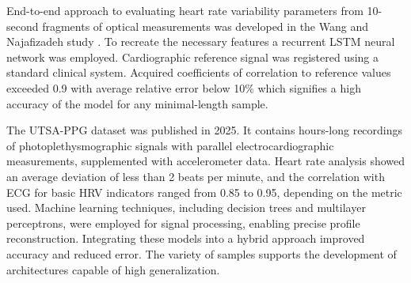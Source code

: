 \documentclass{citask}
\begin{document}
End-to-end approach to evaluating heart rate variability parameters from 10-second fragments of optical measurements was developed in the Wang and Najafizadeh study \cite{17}. To recreate the necessary features a recurrent LSTM neural network was employed. Cardiographic reference signal was registered using a standard clinical system. Acquired coefficients of correlation to reference values exceeded 0.9 with average relative error below 10\% which signifies a high accuracy of the model for any minimal-length sample.

The UTSA-PPG dataset \cite{18} was published in 2025. It contains hours-long recordings of photoplethysmographic signals with parallel electrocardiographic measurements, supplemented with accelerometer data. Heart rate analysis showed an average deviation of less than 2 beats per minute, and the correlation with ECG for basic HRV indicators ranged from 0.85 to 0.95, depending on the metric used. Machine learning techniques, including decision trees and multilayer perceptrons, were employed for signal processing, enabling precise profile reconstruction. Integrating these models into a hybrid approach improved accuracy and reduced error. The variety of samples supports the development of architectures capable of high generalization.
\end{document}
